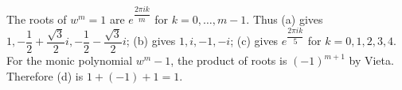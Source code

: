 The roots of $w^m=1$ are $e^{\dfrac{2\pi i k}{m}}$ for $k=0,\ldots,m-1$. Thus (a) gives $1,-\dfrac{1}{2}+\dfrac{\sqrt3}{2}i,-\dfrac{1}{2}-\dfrac{\sqrt3}{2}i$; (b) gives $1,i,-1,-i$; (c) gives $e^{\dfrac{2\pi i k}{5}}$ for $k=0,1,2,3,4$. For the monic polynomial $w^m-1$, the product of roots is $(-1)^{m+1}$ by Vieta. Therefore (d) is $1+(-1)+1=\boxed1$.
